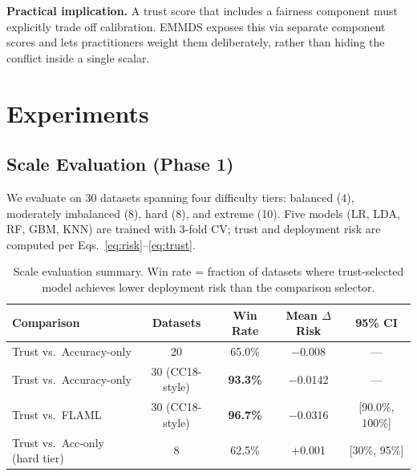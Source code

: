 \documentclass[10pt]{article}
\begin{document}
\textbf{Practical implication.} A trust score that includes a fairness component must explicitly trade off calibration. EMMDS exposes this via separate component scores and lets practitioners weight them deliberately, rather than hiding the conflict inside a single scalar.

\section{Experiments}
\label{sec:experiments}

\subsection{Scale Evaluation (Phase 1)}

We evaluate on 30 datasets spanning four difficulty tiers: balanced (4), moderately imbalanced (8), hard (8), and extreme (10). Five models (LR, LDA, RF, GBM, KNN) are trained with 3-fold CV; trust and deployment risk are computed per Eqs.~\eqref{eq:risk}--\eqref{eq:trust}.

\begin{table}[h]
\centering
\caption{Scale evaluation summary. Win rate = fraction of datasets where trust-selected model achieves lower deployment risk than the comparison selector.}
\label{tab:scale}
\begin{tabular}{lcccc}
\toprule
\textbf{Comparison} & \textbf{Datasets} & \textbf{Win Rate} & \textbf{Mean $\Delta$Risk} & \textbf{95\% CI} \\
\midrule
Trust vs.\ Accuracy-only & 20 & 65.0\% & $-$0.008 & --- \\
Trust vs.\ Accuracy-only & 30 (CC18-style) & \textbf{93.3\%} & $-$0.0142 & --- \\
Trust vs.\ FLAML         & 30 (CC18-style) & \textbf{96.7\%} & $-$0.0316 & [90.0\%, 100\%] \\
\midrule
Trust vs.\ Acc-only (hard tier) & 8 & 62.5\% & $+$0.001 & [30\%, 95\%] \\
\bottomrule
\end{tabular}
\end{table}
\end{document}
